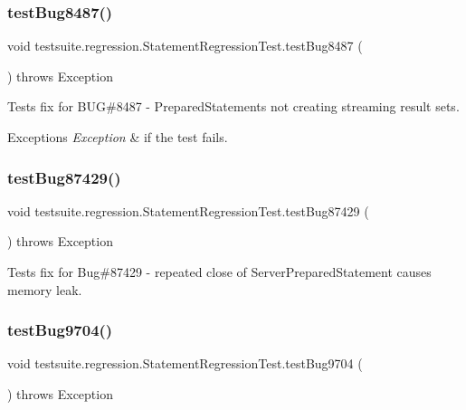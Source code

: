 \subsubsection{\texorpdfstring{test\+Bug8487()}{testBug8487()}}
{\footnotesize\ttfamily void testsuite.\+regression.\+Statement\+Regression\+Test.\+test\+Bug8487 (\begin{DoxyParamCaption}{ }\end{DoxyParamCaption}) throws Exception}

Tests fix for B\+UG\#8487 -\/ Prepared\+Statements not creating streaming result sets.


\begin{DoxyExceptions}{Exceptions}
{\em Exception} & if the test fails. \\
\hline
\end{DoxyExceptions}
\mbox{\label{classtestsuite_1_1regression_1_1_statement_regression_test_aa6905a68082eddc9934046c2d8c15bae}} 
\subsubsection{\texorpdfstring{test\+Bug87429()}{testBug87429()}}
{\footnotesize\ttfamily void testsuite.\+regression.\+Statement\+Regression\+Test.\+test\+Bug87429 (\begin{DoxyParamCaption}{ }\end{DoxyParamCaption}) throws Exception}

Tests fix for Bug\#87429 -\/ repeated close of Server\+Prepared\+Statement causes memory leak. \mbox{\label{classtestsuite_1_1regression_1_1_statement_regression_test_a5da35a1c85dea6e6eac135094859b6d2}} 
\subsubsection{\texorpdfstring{test\+Bug9704()}{testBug9704()}}
{\footnotesize\ttfamily void testsuite.\+regression.\+Statement\+Regression\+Test.\+test\+Bug9704 (\begin{DoxyParamCaption}{ }\end{DoxyParamCaption}) throws Exception}

